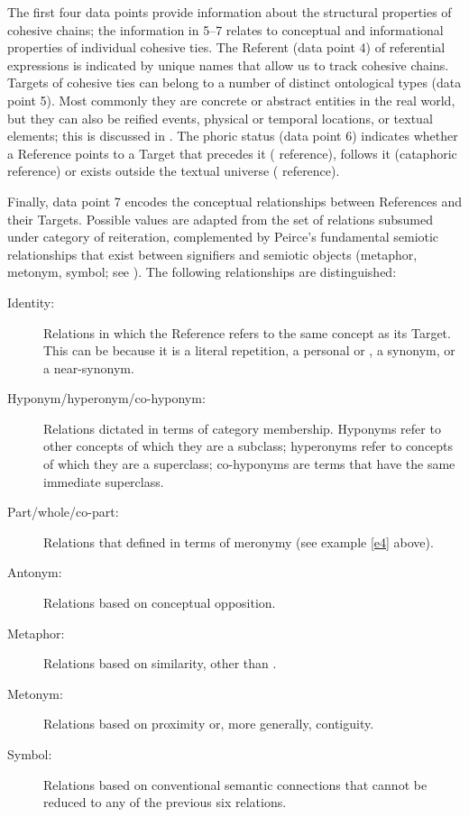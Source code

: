 \documentclass[output=paper
,modfonts
,nonflat]{langsci/langscibook}
\begin{document}
\noindent
The first four data points provide information about the structural properties of cohesive chains; the information in 5--7 relates to conceptual and informational properties of individual cohesive ties. The Referent (data point 4) of referential expressions is indicated by unique names that allow us to track cohesive chains. Targets of cohesive ties can belong to a number of distinct ontological types (data point 5). Most commonly they are concrete or abstract entities in the real world, but they can also be reified events, physical or temporal locations, or textual elements; this is discussed in . The phoric status (data point 6) indicates whether a Reference points to a Target that precedes it ( reference), follows it (cataphoric reference) or exists outside the textual universe ( reference).

Finally, data point 7 encodes the conceptual relationships between References and their Targets. Possible values are adapted from the set of relations subsumed under \citet[277--282]{Halliday1976} category of reiteration, complemented by Peirce’s fundamental semiotic relationships that exist between signifiers and semiotic objects (metaphor, metonym, symbol; see \citealt{Merrell2001}). The following relationships are distinguished:

\begin{description}
	\item[Identity:] Relations in which the Reference refers to the same concept as its Target. This can be because it is a literal repetition, a personal or  , a synonym, or a near-synonym.
	\item[Hyponym/hyperonym/co-hyponym:] Relations dictated in terms of category membership. Hyponyms refer to other concepts of which they are a subclass; hyperonyms refer to concepts of which they are a superclass; co-hyponyms are terms that have the same immediate superclass.
	\item[Part/whole/co-part:] Relations that defined in terms of meronymy (see example \ref{e4} above). 
	\item[Antonym:] Relations based on conceptual opposition.
	\item[Metaphor:] Relations based on similarity, other than .
	\item[Metonym:] Relations based on proximity or, more generally, contiguity.
	\item[Symbol:] Relations based on conventional semantic connections that cannot be reduced to any of the previous six relations.
\end{description}
\end{document}
